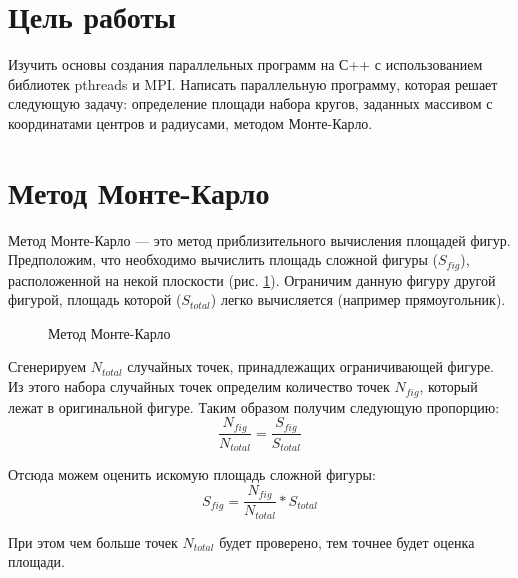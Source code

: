 




\section{Цель работы}
Изучить основы создания параллельных программ на С++ с использованием библиотек pthreads и MPI. Написать параллельную программу, которая решает следующую задачу: определение площади набора кругов, заданных массивом с координатами центров и радиусами, методом Монте-Карло.

\section{Метод Монте-Карло}
Метод Монте-Карло --- это метод приблизительного вычисления площадей фигур. Предположим, что необходимо вычислить площадь сложной фигуры ($S_{fig}$), расположенной на некой плоскости (рис. \ref{fig:monteKarlo}). Ограничим данную фигуру другой фигурой, площадь которой ($S_{total}$) легко вычисляется (например прямоугольник).
\begin{figure}[h!]
\caption{Метод Монте-Карло}
\label{fig:monteKarlo}
\end{figure}

Сгенерируем $N_{total}$ случайных точек, принадлежащих ограничивающей фигуре. Из этого набора случайных точек определим количество точек $N_{fig}$, который лежат в оригинальной фигуре. Таким образом получим следующую пропорцию:
\begin{equation*}
\frac{N_{fig}}{N_{total}} = \frac{S_{fig}}{S_{total}}
\end{equation*}

Отсюда можем оценить искомую площадь сложной фигуры:
\begin{equation*}
S_{fig} = \frac{N_{fig}}{N_{total}} * S_{total}
\end{equation*}

При этом чем больше точек $N_{total}$ будет проверено, тем точнее будет оценка площади.

